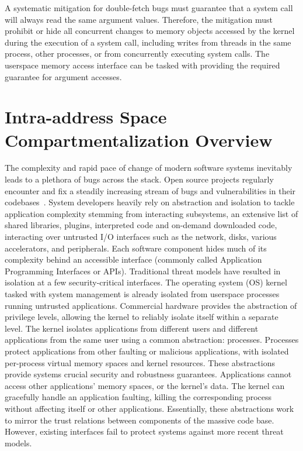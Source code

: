 A systematic mitigation for double-fetch bugs must guarantee that a system call
will always read the same argument values.
Therefore, the mitigation must prohibit or hide all 
concurrent changes to memory objects accessed by the kernel 
during the execution of a system call, 
including writes from threads in the same process, other processes, 
or from concurrently executing system calls.
The userspace memory access interface can be tasked with providing
the required guarantee for argument accesses.

\section{Intra-address Space Compartmentalization Overview}

The complexity and rapid pace of change of modern software systems inevitably
leads to a plethora of bugs across the stack.
Open source projects regularly encounter and fix a steadily increasing stream
of bugs and vulnerabilities in their 
codebases~\cite{kernelbugs, browserwildbugs,vrprewards}.
System developers heavily rely on abstraction and isolation to tackle
application complexity stemming from interacting subsystems, 
an extensive list of shared libraries, 
plugins, interpreted code and on-demand downloaded code, interacting over 
untrusted I/O interfaces such as the network, disks, 
various accelerators, and peripherals.
Each software component hides much of its complexity behind an accessible
interface (commonly called Application Programming Interfaces or APIs).
Traditional threat models have resulted in isolation at a few 
security-critical interfaces.
The operating system (OS) kernel tasked with system management is already
isolated from userspace processes running untrusted applications.
Commercial hardware provides the abstraction of privilege levels, 
allowing the kernel to reliably isolate itself within a separate level.
The kernel isolates applications from different users and 
different applications from the same user using 
a common abstraction: processes.
Processes protect applications from other faulting or malicious applications,
with isolated per-process virtual memory spaces and kernel resources.
These abstractions provide systems crucial security and robustness 
guarantees.
Applications cannot access other applications' memory spaces, or the
kernel's data.
The kernel can gracefully handle an application faulting, killing the
corresponding process without affecting itself or other applications.
Essentially, these abstractions work to mirror the trust relations between
components of the massive code base.
However, existing interfaces fail to protect systems against more recent
threat models.

